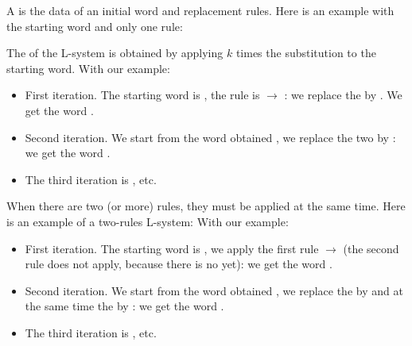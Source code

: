 \documentclass[11pt,class=report,crop=false]{standalone}
\begin{document}
\begin{cours}[L-system]
A  is the data of an initial word and replacement rules.
Here is an example with the starting word and only one rule: 


The  of the L-system is obtained by applying $k$ times the substitution to the starting word.
With our example:
\begin{itemize}
  \item First iteration. The starting word is , the rule is  $\rightarrow$ : we replace the  by . We get the word .
  
  \item Second iteration. We start from the word obtained , we replace the two  by : we get the word .
  
  \item The third iteration is , etc. 

\end{itemize}

When there are two (or more) rules, they must be applied at the same time.
Here is an example of a two-rules L-system:
With our example:
\begin{itemize}
  \item First iteration. The starting word is , we apply the first rule  $\rightarrow$  (the second rule does not apply, because there is no  yet): we get the word .
  
  \item Second iteration. We start from the word obtained , we replace the  by  and at the same time the  by : we get the word .
  
  \item The third iteration is , etc.  
\end{itemize}

\end{cours}
\end{document}
